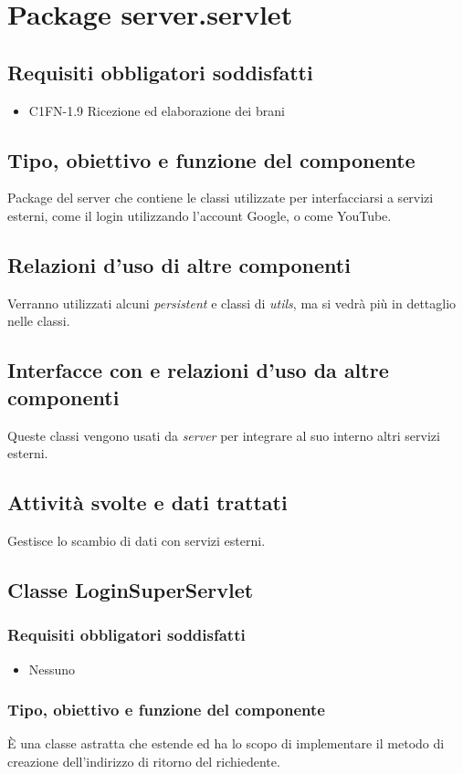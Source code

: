 \newpage
\section{Package server.servlet}
\subsection*{Requisiti obbligatori soddisfatti}
\begin{itemize}
	\item C1FN-1.9 Ricezione ed elaborazione dei brani
\end{itemize}
\subsection*{Tipo, obiettivo e funzione del componente}
Package del server che contiene le classi utilizzate per interfacciarsi a
servizi esterni, come il login utilizzando l'account Google, o come YouTube.
\subsection*{Relazioni d'uso di altre componenti}
Verranno utilizzati alcuni \emph{persistent} e classi di \emph{utils}, ma
si vedr\`a pi\`u in dettaglio nelle classi.
\subsection*{Interfacce con e relazioni d'uso da altre componenti}
Queste classi vengono usati da \emph{server} per integrare al suo interno
altri servizi esterni.
\subsection*{Attivit\`a svolte e dati trattati}
Gestisce lo scambio di dati con servizi esterni.

\subsection{Classe LoginSuperServlet}
\subsubsection*{Requisiti obbligatori soddisfatti}
\begin{itemize}
    \item Nessuno
\end{itemize}
\subsubsection*{Tipo, obiettivo e funzione del componente}
\`E una classe astratta che estende  ed ha lo scopo di
implementare il metodo di creazione dell'indirizzo di ritorno del richiedente.

